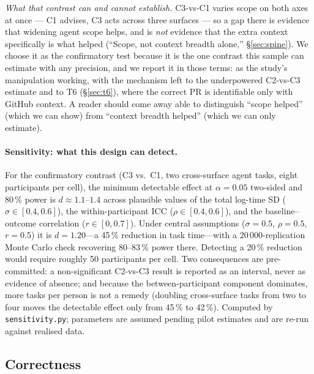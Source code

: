 \documentclass[11pt]{article}
\newcommand{\code}[1]{\texttt{#1}}
\begin{document}
\emph{What that contrast can and cannot establish.} C3-vs-C1 varies scope on both
axes at once --- C1 advises, C3 acts across three surfaces --- so a gap there is
evidence that widening agent scope helps, and is \emph{not} evidence that the
extra context specifically is what helped (``Scope, not context breadth alone,''
\S\ref{sec:spine}). We choose it
as the confirmatory test because it is the one contrast this sample can estimate
with any precision, and we report it in those terms: as the study's manipulation
working, with the mechanism left to the underpowered C2-vs-C3 estimate and to
T6 (\S\ref{sec:t6}), where the correct PR is identifiable only with GitHub
context. A reader should come away able to distinguish ``scope helped'' (which we
can show) from ``context breadth helped'' (which we can only estimate).

\paragraph{Sensitivity: what this design can detect.} For the confirmatory
contrast (C3 vs.\ C1, two cross-surface agent tasks, eight participants per
cell), the minimum detectable effect at $\alpha=0.05$ two-sided and 80\,\% power
is $d\approx1.1$--$1.4$ across plausible values of the total log-time SD
($\sigma\in[0.4,0.6]$), the within-participant ICC ($\rho\in[0.4,0.6]$), and the
baseline--outcome correlation ($r\in[0,0.7]$). Under central assumptions
($\sigma=0.5$, $\rho=0.5$, $r=0.5$) it is $d=1.20$---a 45\,\% reduction in task
time---with a 20\,000-replication Monte Carlo check recovering 80--83\,\% power
there. Detecting a 20\,\% reduction would require roughly 50 participants per
cell. Two consequences are pre-committed: a non-significant C2-vs-C3 result is
reported as an interval, never as evidence of absence; and because the
between-participant component dominates, more tasks per person is not a remedy
(doubling cross-surface tasks from two to four moves the detectable effect only
from 45\,\% to 42\,\%). Computed by \code{sensitivity.py}; parameters are assumed
pending pilot estimates and are re-run against realised data.

\subsection{Correctness}
\end{document}
